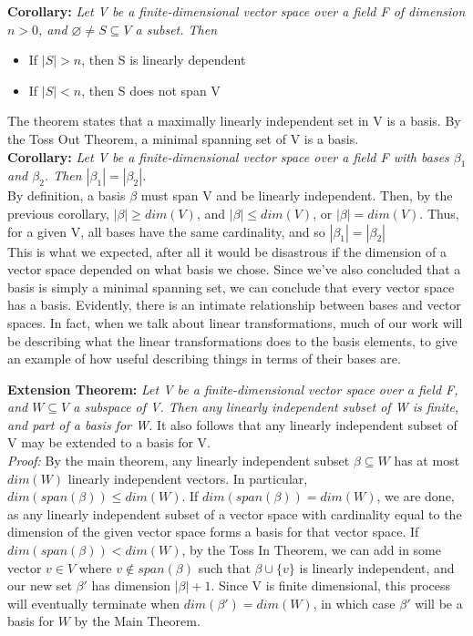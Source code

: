\documentclass[12pt]{article}
\begin{document}
\textbf{Corollary: }\emph{Let V be a finite-dimensional vector space over a field F of dimension $n  > 0$, and $\varnothing \neq S \subseteq V$ a subset. Then}

\begin{itemize}
\item If $|S| > n$, then S is linearly dependent
\item If $|S| < n$, then S does not span V
\end{itemize}
The theorem states that a maximally linearly independent set in V is a basis. By the Toss Out Theorem, a minimal spanning set of V is a basis.\\

\textbf{Corollary: }\emph{Let V be a finite-dimensional vector space over a field F with bases $\beta_1$ and $\beta_2$. Then $|\beta_1| = |\beta_2|$.}\\

By definition, a basis $\beta$ must span V and be linearly independent. Then, by the previous corollary, $|\beta| \geq dim(V)$, and $|\beta| \leq dim(V)$, or $|\beta| = dim(V)$. Thus, for a given V, all bases have the same cardinality, and so $|\beta_1| = |\beta_2|$\\

This is what we expected, after all it would be disastrous if the dimension of a vector space depended on what basis we chose. Since we've also concluded that a basis is simply a minimal spanning set, we can conclude that every vector space has a basis. Evidently, there is an intimate relationship between bases and vector spaces. In fact, when we talk about linear transformations, much of our work will be describing what the linear transformations does to the basis elements, to give an example of how useful describing things in terms of their bases are.

\textbf{Extension Theorem: }\emph{Let V be a finite-dimensional vector space over a field F, and $W \subseteq V$ a subspace of V. Then any linearly independent subset of W is finite, and part of a basis for W.} It also follows that any linearly independent subset of V may be extended to a basis for V.\\

\emph{Proof: }By the main theorem, any linearly independent subset $\beta \subseteq W$ has at most $dim(W)$ linearly independent vectors. In particular, $dim(span(\beta)) \leq dim(W)$. If $dim(span(\beta)) = dim(W)$, we are done, as any linearly independent subset of a vector space with cardinality equal to the dimension of the given vector space forms a basis for that vector space. If $dim(span(\beta)) < dim(W)$, by the Toss In Theorem, we can add in some vector $v \in V$ where $v \notin span(\beta)$ such that $\beta \cup \{ v \}$ is linearly independent, and our new set $\beta'$ has dimension $|\beta| + 1$. Since V is finite dimensional, this process will eventually terminate when $dim(\beta') = dim(W)$, in which case $\beta'$ will be a basis for $W$ by the Main Theorem.\\
\end{document}
